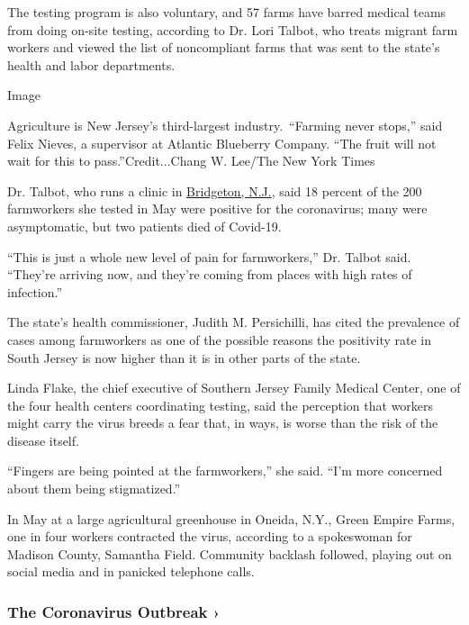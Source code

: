 The testing program is also voluntary, and 57 farms have barred medical
teams from doing on-site testing, according to Dr. Lori Talbot, who
treats migrant farm workers and viewed the list of noncompliant farms
that was sent to the state's health and labor departments.

Image

Agriculture is New Jersey's third-largest industry.~``Farming never
stops,'' said Felix Nieves, a supervisor at Atlantic Blueberry Company.
``The fruit will not wait for this to pass.''Credit...Chang W. Lee/The
New York Times

Dr. Talbot, who runs a clinic in
\href{https://www.nytimes3xbfgragh.onion/2019/10/01/nyregion/missing-child-nj-dulce-alavez.html}{Bridgeton,
N.J.}, said 18 percent of the 200 farmworkers she tested in May were
positive for the coronavirus; many were asymptomatic, but two patients
died of Covid-19.

``This is just a whole new level of pain for farmworkers,'' Dr. Talbot
said. ``They're arriving now, and they're coming from places with high
rates of infection.''

The state's health commissioner, Judith M. Persichilli, has cited the
prevalence of cases among farmworkers as one of the possible reasons the
positivity rate in South Jersey is now higher than it is in other parts
of the state.

Linda Flake, the chief executive of Southern Jersey Family Medical
Center, one of the four health centers coordinating testing, said the
perception that workers might carry the virus breeds a fear that, in
ways, is worse than the risk of the disease itself.

``Fingers are being pointed at the farmworkers,'' she said. ``I'm more
concerned about them being stigmatized.''

In May at a large agricultural greenhouse in Oneida, N.Y., Green Empire
Farms, one in four workers contracted the virus, according to a
spokeswoman for Madison County, Samantha Field. Community backlash
followed, playing out on social media and in panicked telephone calls.

\href{https://www.nytimes3xbfgragh.onion/news-event/coronavirus?action=click\&pgtype=Article\&state=default\&region=MAIN_CONTENT_3\&context=storylines_faq}{}

\hypertarget{the-coronavirus-outbreak-}{%
\subsubsection{The Coronavirus Outbreak
›}\label{the-coronavirus-outbreak-}}

